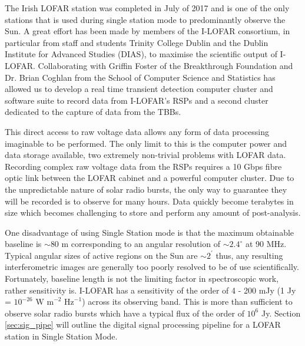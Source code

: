 The Irish LOFAR station was completed in July of 2017 and is one of the only stations that is used during single station mode to predominantly observe the Sun. A great effort has been made by members of the I-LOFAR consortium, in particular from staff and students Trinity College Dublin and the Dublin Institute for Advanced Studies (DIAS), to maximise the scientific output of I-LOFAR. Collaborating with Griffin Foster of the Breakthrough Foundation and Dr. Brian Coghlan from the School of Computer Science and Statistics has allowed us to develop a real time transient detection computer cluster and software suite to record data from I-LOFAR's RSPs and a second cluster dedicated to the capture of data from the TBBs. %

This direct access to raw voltage data allows any form of data processing imaginable to be performed. The only limit to this is the computer power and data storage available, two extremely non-trivial problems with LOFAR data. Recording complex raw voltage data from the RSPs requires a 10 Gbps fibre optic link between the LOFAR cabinet and a powerful computer cluster. Due to the unpredictable nature of solar radio bursts, the only way to guarantee they will be recorded is to observe for many hours. Data quickly become terabytes in size which becomes challenging to store and perform any amount of post-analysis.

One disadvantage of using Single Station mode is that the maximum obtainable baseline is $\sim 80$ m corresponding to an angular resolution of $\sim 2.4^{\circ}$ at 90 MHz. Typical angular sizes of active regions on the Sun are $\sim 2^\prime$ thus, any resulting interferometric images are generally too poorly resolved to be of use scientifically. Fortunately, baseline length is not the limiting factor in spectroscopic work, rather sensitivity is. I-LOFAR has a sensitivity of the order of 4 - 200 mJy (1 Jy = $10^{-26} \mbox{ W m}^{-2} \mbox{ Hz}^{-1}$) across its observing band. This is more than sufficient to observe solar radio bursts which have a typical flux of the order of $10^6$ Jy.
Section \ref{sec:sig_pipe} will outline the digital signal processing pipeline for a LOFAR station in Single Station Mode.




